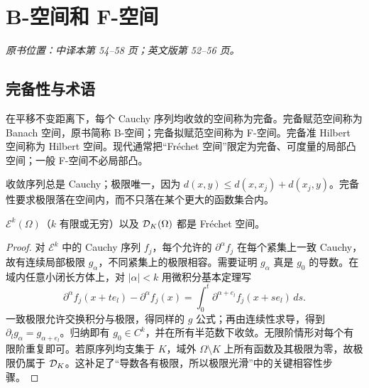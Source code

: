 \section{B-空间和 F-空间}\label{sec:yosida-01-09}
\noindent\textit{原书位置：中译本第 54--58 页；英文版第 52--56 页。}

\subsection{完备性与术语}
\begin{definition}
在平移不变距离下，每个 Cauchy 序列均收敛的空间称为完备。完备赋范空间称为 Banach 空间，原书简称 B-空间；完备拟赋范空间称为 F-空间。完备准 Hilbert 空间称为 Hilbert 空间。现代通常把“Fréchet 空间”限定为完备、可度量的局部凸空间；一般 F-空间不必局部凸。
\end{definition}
收敛序列总是 Cauchy；极限唯一，因为 $d(x,y)\le d(x,x_j)+d(x_j,y)$。完备性要求极限落在空间内，而不只落在某个更大的函数集合内。

\begin{theorem}[光滑函数空间与固定支集测试空间完备]\label{thm:y1-smooth-complete}
$\mathcal E^k(\Omega)$（$k$ 有限或无穷）以及 $\mathcal{D}_K(\Omega)$ 都是 Fréchet 空间。
\end{theorem}
\begin{proof}
对 $\mathcal E^k$ 中的 Cauchy 序列 $f_j$，每个允许的 $\partial^\alpha f_j$ 在每个紧集上一致 Cauchy，故有连续局部极限 $g_\alpha$，不同紧集上的极限相容。需要证明 $g_\alpha$ 真是 $g_0$ 的导数。在域内任意小闭长方体上，对 $|\alpha|<k$ 用微积分基本定理写
\[
 \partial^\alpha f_j(x+te_l)-\partial^\alpha f_j(x)
 =\int_0^t\partial^{\alpha+e_l}f_j(x+se_l)\,ds.
\]
一致极限允许交换积分与极限，得同样的 $g$ 公式；再由连续性求导，得到 $\partial_lg_\alpha=g_{\alpha+e_l}$。归纳即有 $g_0\in C^k$，并在所有半范数下收敛。无限阶情形对每个有限阶重复即可。若原序列均支集于 $K$，域外 $\Omega\setminus K$ 上所有函数及其极限为零，故极限仍属于 $\mathcal{D}_K$。这补足了“导数各有极限，所以极限光滑”中的关键相容性步骤。
\end{proof}

